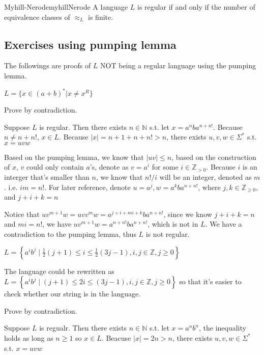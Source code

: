 \documentclass[a4paper]{article}
\newcommand{\N}{\mathbb{N}}
\newcommand{\Z}{\mathbb{Z}}
\begin{document}
\begin{Theorem}{Myhill-Nerode}{myhillNerode}
A language $L$ is regular if and only if the number of equivalence classes of $\approx_{L}$ is finite.
	
\end{Theorem}

\newpage
\subsection{Exercises using pumping lemma}

The followings are proofs of $L$ NOT being a regular language using the pumping lemma.

\begin{tcolorbox}[enhanced,breakable,colback=white]
$L = \{ x \in (a+b)^* | x \neq x^R \}$
\end{tcolorbox}
Prove by contradiction.

Suppose $L$ is regular. Then there exists $n \in  \N$ s.t. let $x = a^n b a^{n+n!}$. Because $n\neq n+n!$, $x \in L$. Because  $|x| = n+1+n+n! > n$, there exists  $u,v,w \in  \Sigma^*$ s.t. $x = uvw$ 

Based on the pumping lemma, we know that  $|uv|\le n$, based on the construction of $x$,  $v$ could only contain  $a$'s, denote as $v=a^i$ for some  $i \in \Z_{>0}$. Because $i$ is an interger that's smaller than  $n$, we know that  $n!/i$ will be an integer, denoted as $m$. i.e.  $im=n!$. For later reference, denote  $u=a^j,w=a^kba^{n+n!}$, where  $j,k \in \Z_{\ge 0}$, and $j+i+k=n$

Notice that $uv^{m+1}w=uvv^mw=a^{j+i+mi+k}ba^{n+n!}$, since we know $j+i+k=n$ and  $mi=n!$, we have  $uv^{m+1}w=a^{n+n!}ba^{n+n!}$, which is not in $L$. We have a contradiction to the pumping lemma, thus  $L$ is not regular.

\bigskip

\begin{tcolorbox}[enhanced,breakable,colback=white]
$L=\left\{a^{i} b^{j} \mid \frac{1}{2}(j+1) \leq i \leq \frac{1}{2}(3 j-1), i, j \in \mathbb{Z}, j \geq 0\right\}$
\end{tcolorbox}
The language could be rewritten as $L=\left\{a^{i} b^{j} \mid (j+1) \leq 2i \leq (3 j-1), i, j \in \mathbb{Z}, j \geq 0\right\}$ so that it's easier to check whether our string is in the language. 

Prove by contradiction.

Suppose $L$ is regualr. Then there exists $n\in \N$ s.t. let $x=a^nb^n$, the inequality holds as long as  $n\ge 1$ so $x \in L$. Beacuse $|x|=2n>n$, there exists  $u,v,w \in \Sigma^*$ s.t. $x=uvw$
\end{document}
